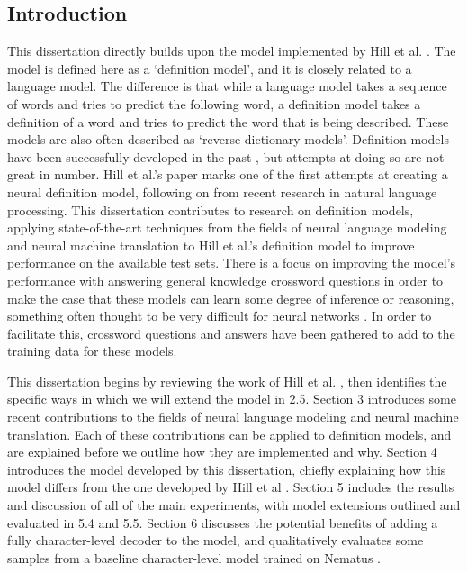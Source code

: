 \documentclass[11pt]{article}
\begin{document}
\newpage
\begin{spacing}{1}
\normalsize
{}
\section{Introduction}
This dissertation directly builds upon the model implemented by Hill et al. \citeyear{hill2015learning}. The model is defined here as a `definition model', and it is closely related to a language model. The difference is that while a language model takes a sequence of words and tries to predict the following word, a definition model takes a definition of a word and tries to predict the word that is being described. These models are also often described as `reverse dictionary models'. Definition models have been successfully developed in the past \cite{bilac2004dictionary}, but attempts at doing so are not great in number. Hill et al.'s \citeyear{hill2015learning} paper marks one of the first attempts at creating a neural definition model, following on from recent research in natural language processing. This dissertation contributes to research on definition models, applying state-of-the-art techniques from the fields of neural language modeling and neural machine translation to Hill et al.'s \citeyear{hill2015learning} definition model to improve performance on the available test sets. There is a focus on improving the model's performance with answering general knowledge crossword questions in order to make the case that these models can learn some degree of inference or reasoning, something often thought to be very difficult for neural networks \cite{NIPS2017_7082}. In order to facilitate this, crossword questions and answers have been gathered to add to the training data for these models.

This dissertation begins by reviewing the work of Hill et al. \citeyear{hill2015learning}, then identifies the specific ways in which we will extend the model in 2.5. Section 3 introduces some recent contributions to the fields of neural language modeling and neural machine translation. Each of these contributions can be applied to definition models, and are explained before we outline how they are implemented and why. Section 4 introduces the model developed by this dissertation, chiefly explaining how this model differs from the one developed by Hill et al \citeyear{hill2015learning}. Section 5 includes the results and discussion of all of the main experiments, with model extensions outlined and evaluated in 5.4 and 5.5. Section 6 discusses the potential benefits of adding a fully character-level decoder to the model, and qualitatively evaluates some samples from a baseline character-level model trained on Nematus \cite{sennrich-EtAl:2017:EACLDemo}.


\end{spacing}
\end{document}
